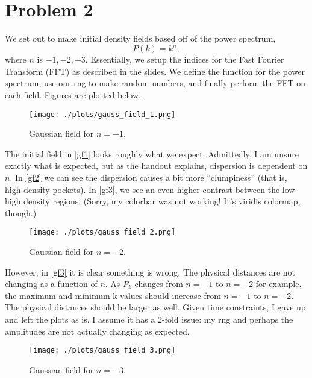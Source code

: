 \section{Problem 2}


We set out to make initial density fields based off of the power spectrum,
\begin{equation}
  P(k) = k^n,
\end{equation}
where $n$ is $-1, -2, -3$. Essentially, we setup the indices for the Fast
Fourier Transform (FFT) as described in the slides. We define the function
for the power spectrum, use our rng to make random numbers, and finally
perform the FFT on each field. Figures are plotted below.

\begin{figure}[h!]
    \centering
    \texttt{[image: ./plots/gauss\_field\_1.png]}
    \caption{Gaussian field for $n=-1$.}
    \label{gf1}
\end{figure}
The initial field in \autoref{gf1} looks roughly what we expect.
Admittedly, I am unsure exactly what is expected, but as the handout
explains, dispersion is dependent on $n$. In \autoref{gf2} we can see
the dispersion causes a bit more ``clumpiness'' (that is, high-density
pockets). In \autoref{gf3}, we see an even higher contrast between
the low-high density regions. (Sorry, my colorbar was not working! It's 
viridis colormap, though.)
\begin{figure}[h!]
    \centering
    \texttt{[image: ./plots/gauss\_field\_2.png]}
    \caption{Gaussian field for $n=-2$.}
    \label{gf2}
\end{figure}
However, in \autoref{gf3} it is clear something is wrong. The physical
distances are not changing as a function of $n$. As $P_k$ changes from
$n=-1$ to $n=-2$ for example, the maximum and minimum k values should increase
from $n=-1$ to $n=-2$. The physical distances should be larger as well.
Given time constraints, I gave up and left the plots as is. I assume 
it has a $2$-fold issue: my rng and perhaps the amplitudes are not actually
changing as expected.
\begin{figure}[h!]
    \centering
    \texttt{[image: ./plots/gauss\_field\_3.png]}
    \caption{Gaussian field for $n=-3$.}
    \label{gf3}
\end{figure}

